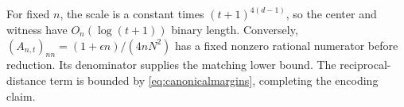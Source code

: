 For fixed $n$, the scale is a constant times $(t+1)^{4(d-1)}$, so the center and witness have $O_n(\log(t+1))$ binary length. Conversely,
$(A_{n,t})_{nn}=(1+\epsilon n)/(4nN^2)$ has a fixed nonzero rational numerator before reduction. Its denominator supplies the matching lower bound. The reciprocal-distance term is bounded by \eqref{eq:canonicalmargins}, completing the encoding claim.
